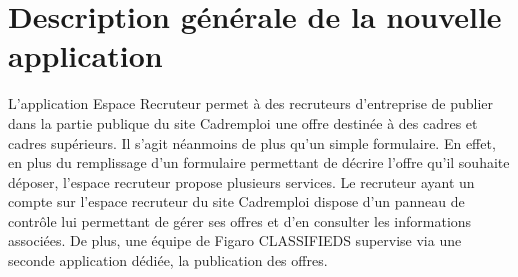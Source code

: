 \section{Description générale de la nouvelle application}
\label{sec:Description generale de l'application}
L'application Espace Recruteur permet à des recruteurs d'entreprise de publier dans la partie publique du site Cadremploi une offre destinée à des cadres et cadres supérieurs.
Il s'agit néanmoins de plus qu'un simple formulaire.
En effet, en plus du remplissage d'un formulaire permettant de décrire l'offre qu'il souhaite déposer, l'espace recruteur propose plusieurs services.
Le recruteur ayant un compte sur l'espace recruteur du site Cadremploi dispose d'un panneau de contrôle lui permettant de gérer ses offres et d'en consulter les informations associées.
De plus, une équipe de Figaro CLASSIFIEDS supervise via une seconde application dédiée, la publication des offres.

